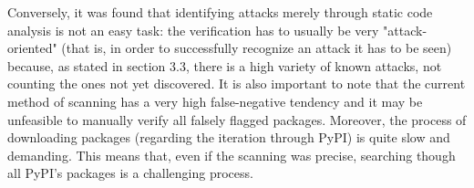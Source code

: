 Conversely, it was found that identifying attacks merely through static code analysis is not an easy task: the verification has to usually be very "attack-oriented" (that is, in order to successfully recognize an attack it has to be seen) because, as stated in section 3.3, there is a high variety of known attacks, not counting the ones not yet discovered. It is also important to note that the current method of scanning has a very high false-negative tendency and it may be unfeasible to manually verify all falsely flagged packages.
Moreover, the process of downloading packages (regarding the iteration through PyPI) is quite slow and demanding. This means that, even if the scanning was precise, searching though all PyPI's packages is a challenging process.